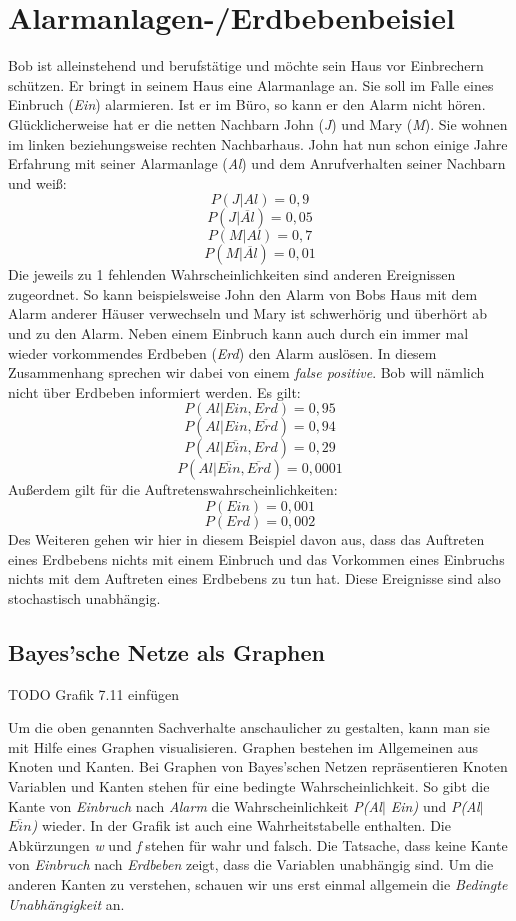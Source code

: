 \section{Alarmanlagen-/Erdbebenbeisiel}
Bob ist alleinstehend und berufstätige und möchte sein Haus vor Einbrechern schützen. Er bringt in seinem Haus eine Alarmanlage an. Sie soll im Falle eines Einbruch (\textit{Ein}) alarmieren. Ist er im Büro, so kann er den Alarm nicht hören. Glücklicherweise hat er die netten Nachbarn John (\textit{J}) und Mary (\textit{M}). Sie wohnen im linken beziehungsweise rechten Nachbarhaus. John hat nun schon einige Jahre Erfahrung mit seiner Alarmanlage (\textit{Al}) und dem Anrufverhalten seiner Nachbarn und weiß: 
\[ P(J\vert Al) = 0,9\] 
\[ P(J\vert \overline{Al}) = 0,05\]
\[ P(M\vert Al) = 0,7\]
\[ P(M\vert \overline{Al} ) = 0,01\]
Die jeweils zu 1 fehlenden Wahrscheinlichkeiten sind anderen Ereignissen zugeordnet. So kann beispielsweise John den Alarm von Bobs Haus mit dem Alarm anderer Häuser verwechseln und Mary ist schwerhörig und überhört ab und zu den Alarm. 
Neben einem Einbruch kann auch durch ein immer mal wieder vorkommendes Erdbeben (\textit{Erd}) den Alarm auslösen. In diesem Zusammenhang sprechen wir dabei von einem \textit{false positive}. Bob will nämlich nicht über Erdbeben informiert werden. Es gilt:
\[ P(Al\vert Ein, Erd) = 0,95\] 
\[ P(Al\vert Ein,\overline{Erd}) = 0,94\]
\[ P(Al\vert \overline{Ein}, Erd) = 0,29\]
\[ P(Al\vert \overline{Ein}, \overline{Erd})  = 0,0001\]
Außerdem gilt für die Auftretenswahrscheinlichkeiten: 
\[ P(Ein) = 0,001\]
\[ P(Erd) = 0,002\]
Des Weiteren gehen wir hier in diesem Beispiel davon aus, dass das Auftreten eines Erdbebens nichts mit einem Einbruch und das Vorkommen eines Einbruchs nichts mit dem Auftreten eines Erdbebens zu tun hat. Diese Ereignisse sind also stochastisch unabhängig.   
\subsection{Bayes'sche Netze als Graphen}
TODO Grafik 7.11 einfügen

Um die oben genannten Sachverhalte anschaulicher zu gestalten, kann man sie mit Hilfe eines Graphen visualisieren. Graphen bestehen im Allgemeinen aus Knoten und Kanten. Bei Graphen von Bayes'schen Netzen repräsentieren Knoten Variablen und Kanten stehen für eine bedingte Wahrscheinlichkeit. So gibt die Kante von \textit{Einbruch} nach \textit{Alarm} die Wahrscheinlichkeit \textit{P(Al$\vert$ Ein)} und \textit{P(Al$\vert$ $\overline{Ein}$)} wieder. In der Grafik ist auch eine Wahrheitstabelle enthalten. Die Abkürzungen \textit{w} und \textit{f} stehen für wahr und falsch. Die Tatsache, dass keine Kante von \textit{Einbruch} nach \textit{Erdbeben} zeigt, dass die Variablen unabhängig sind. Um die anderen Kanten zu verstehen, schauen wir uns erst einmal allgemein die \textit{Bedingte Unabhängigkeit} an. 

